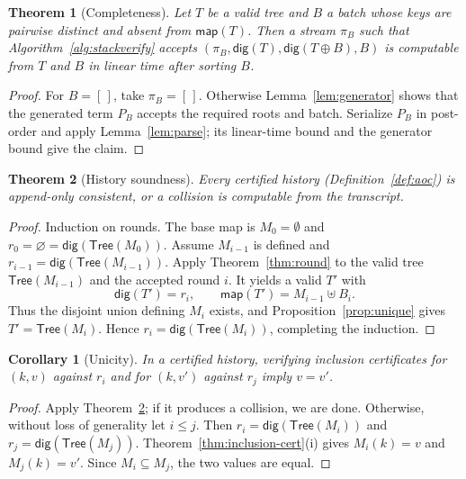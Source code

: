 \documentclass[twocolumn]{article}
\newtheorem{theorem}{Theorem}
\newtheorem{corollary}{Corollary}
\begin{document}
\begin{theorem}[Completeness]
\label{thm:complete}
Let $T$ be a valid tree and $B$ a batch whose keys are pairwise distinct and absent from $\mathsf{map}(T)$. Then a stream $\pi_B$ such that Algorithm~\ref{alg:stackverify} accepts $(\pi_B, \mathsf{dig}(T), \mathsf{dig}(T \oplus B), B)$ is computable from $T$ and $B$ in linear time after sorting $B$.
\end{theorem}
\begin{proof}
For $B=[\,]$, take $\pi_B=[\,]$. Otherwise Lemma~\ref{lem:generator} shows that the generated term $P_B$ accepts the required roots and batch. Serialize $P_B$ in post-order and apply Lemma~\ref{lem:parse}; its linear-time bound and the generator bound give the claim.
\end{proof}

\begin{theorem}[History soundness]
\label{thm:history}
Every certified history (Definition~\ref{def:aoc}) is append-only consistent, or a collision is computable from the transcript.
\end{theorem}
\begin{proof}
Induction on rounds. The base map is $M_0=\emptyset$ and $r_0=\varnothing=\mathsf{dig}(\mathsf{Tree}(M_0))$. Assume $M_{i-1}$ is defined and $r_{i-1}=\mathsf{dig}(\mathsf{Tree}(M_{i-1}))$. Apply Theorem~\ref{thm:round} to the valid tree $\mathsf{Tree}(M_{i-1})$ and the accepted round $i$. It yields a valid $T'$ with
\[
  \mathsf{dig}(T')=r_i,
  \qquad
  \mathsf{map}(T')=M_{i-1}\uplus B_i.
\]
Thus the disjoint union defining $M_i$ exists, and Proposition~\ref{prop:unique} gives $T'=\mathsf{Tree}(M_i)$. Hence $r_i=\mathsf{dig}(\mathsf{Tree}(M_i))$, completing the induction.
\end{proof}

\begin{corollary}[Unicity]
\label{cor:unicity}
In a certified history, verifying inclusion certificates for $(k, v)$ against $r_i$ and for $(k, v')$ against $r_j$ imply $v = v'$.
\end{corollary}
\begin{proof}
Apply Theorem~\ref{thm:history}; if it produces a collision, we are done. Otherwise, without loss of generality let $i\leq j$. Then $r_i=\mathsf{dig}(\mathsf{Tree}(M_i))$ and $r_j=\mathsf{dig}(\mathsf{Tree}(M_j))$. Theorem~\ref{thm:inclusion-cert}(i) gives $M_i(k)=v$ and $M_j(k)=v'$. Since $M_i\subseteq M_j$, the two values are equal.
\end{proof}
\end{document}
